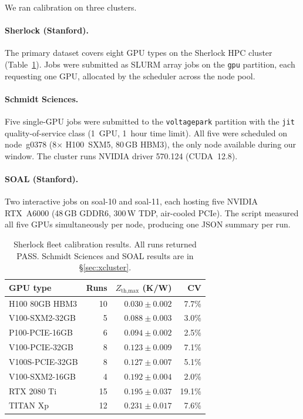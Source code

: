 \documentclass[conference]{IEEEtran}
\begin{document}
We ran calibration on three clusters.

\paragraph{Sherlock (Stanford).}
The primary dataset covers eight GPU types on the Sherlock HPC cluster
(Table~\ref{tab:fleet}).
Jobs were submitted as SLURM array jobs on the \texttt{gpu} partition,
each requesting one GPU, allocated by the scheduler across the node pool.

\paragraph{Schmidt Sciences.}
Five single-GPU jobs were submitted to the \texttt{voltagepark}
partition with the \texttt{jit} quality-of-service class
(1~GPU, 1~hour time limit).
All five were scheduled on node~g0378 (8$\times$ H100~SXM5, 80\,GB
HBM3), the only node available during our window.
The cluster runs NVIDIA driver 570.124 (CUDA~12.8).

\paragraph{SOAL (Stanford).}
Two interactive jobs on soal-10 and soal-11, each hosting five NVIDIA
RTX~A6000 (48\,GB GDDR6, 300\,W TDP, air-cooled PCIe).
The script measured all five GPUs simultaneously per node,
producing one JSON summary per run.

\begin{table}[h]
  \centering
  \small
  \begin{tabular}{lrrr}
    \toprule
    GPU type & Runs & $Z_\text{th,max}$ (K/W) & CV \\
    \midrule
    H100 80GB HBM3     & 10 & $0.030 \pm 0.002$ & 7.7\% \\
    V100-SXM2-32GB     &  5 & $0.088 \pm 0.003$ & 3.0\% \\
    P100-PCIE-16GB     &  6 & $0.094 \pm 0.002$ & 2.5\% \\
    V100-PCIE-32GB     &  8 & $0.123 \pm 0.009$ & 7.1\% \\
    V100S-PCIE-32GB    &  8 & $0.127 \pm 0.007$ & 5.1\% \\
    V100-SXM2-16GB     &  4 & $0.192 \pm 0.004$ & 2.0\% \\
    RTX 2080 Ti        & 15 & $0.195 \pm 0.037$ & 19.1\% \\
    TITAN Xp           & 12 & $0.231 \pm 0.017$ & 7.6\% \\
    \bottomrule
  \end{tabular}
  \caption{Sherlock fleet calibration results. All runs returned PASS.
           Schmidt Sciences and SOAL results are in \S\ref{sec:xcluster}.}
  \label{tab:fleet}
\end{table}
\end{document}
